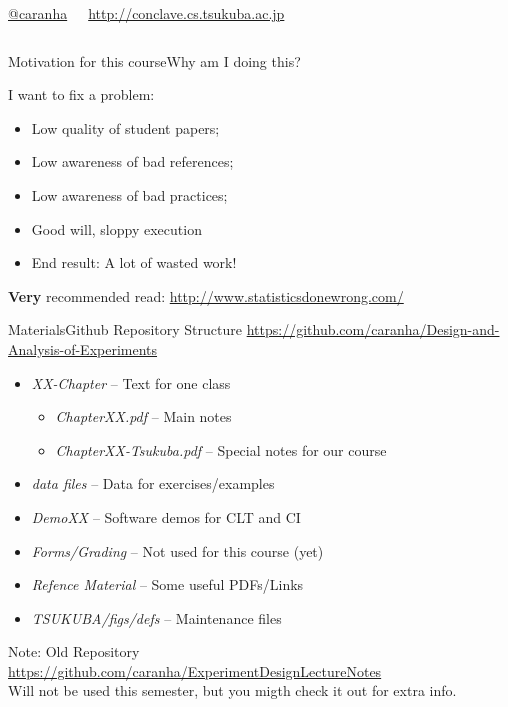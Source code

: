 \documentclass[t]{beamer}
\begin{document}
\begin{ftst}
\begin{columns}[T]
  \spitem {} \href{http://www.twitter.com/caranha}{@caranha}
  \item \url{http://conclave.cs.tsukuba.ac.jp}
  \eitem
\end{columns}
\end{ftst}

\begin{ftst}
{Motivation for this course}{Why am I doing this?}  


I want to fix a problem:
\vone
\begin{itemize}
  \item Low quality of student papers;
  \item Low awareness of bad references;
  \item Low awareness of bad practices;
  \item Good will, sloppy execution
  \item End result: A lot of wasted work!
\end{itemize}

\vfill

{\bf Very} recommended read: \url{http://www.statisticsdonewrong.com/}
\end{ftst}

\begin{ftst}
{Materials}{Github Repository Structure}
{\small \url{https://github.com/caranha/Design-and-Analysis-of-Experiments}}
\begin{itemize}
  \item \emph{XX-Chapter} -- Text for one class
    \begin{itemize}
    \item \emph{ChapterXX.pdf} -- Main notes
    \item \emph{ChapterXX-Tsukuba.pdf} -- Special notes for our course
    \end{itemize}
  \item \emph{data files} -- Data for exercises/examples
  \item \emph{DemoXX} -- Software demos for CLT and CI
  \item \emph{Forms/Grading} -- Not used for this course (yet)
  \item \emph{Refence Material} -- Some useful PDFs/Links
  \item \emph{TSUKUBA/figs/defs} -- Maintenance files    
\end{itemize}

\begin{block}{Note: Old Repository}
  {\small \url{https://github.com/caranha/ExperimentDesignLectureNotes}}\\
  \vhalf
  Will not be used this semester, but you migth check it out for extra info.
\end{block}
\end{ftst}
\end{document}
